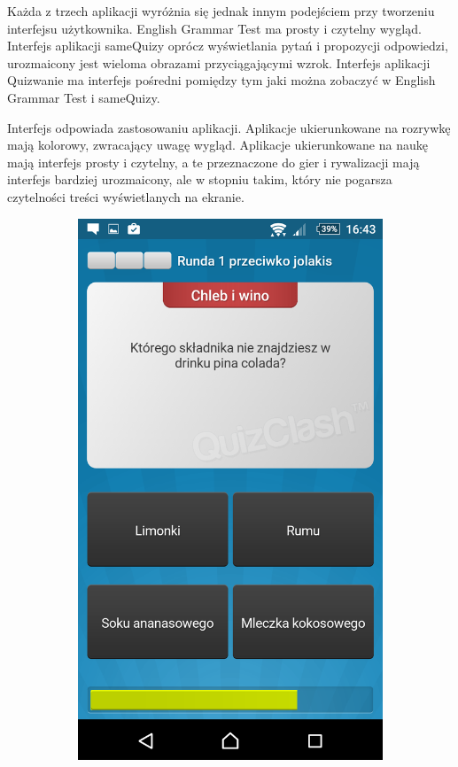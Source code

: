 \documentclass[eng]{mgr}
\begin{document}
		Każda z trzech aplikacji wyróżnia się jednak innym podejściem przy tworzeniu interfejsu użytkownika. English Grammar Test ma prosty i czytelny wygląd. Interfejs aplikacji sameQuizy oprócz wyświetlania pytań i propozycji odpowiedzi, urozmaicony jest wieloma obrazami przyciągającymi wzrok. Interfejs aplikacji Quizwanie ma interfejs pośredni pomiędzy tym jaki można zobaczyć w English Grammar Test i sameQuizy.
		
		Interfejs odpowiada zastosowaniu aplikacji. Aplikacje ukierunkowane na rozrywkę mają kolorowy, zwracający uwagę wygląd. Aplikacje ukierunkowane na naukę mają interfejs prosty i czytelny, a te przeznaczone do gier i rywalizacji mają interfejs bardziej urozmaicony, ale w stopniu takim, który nie pogarsza czytelności treści wyświetlanych na ekranie.
		
		\begin{figure}[ht]
			\centering
			\begin{subfigure}{.32\textwidth}
				\centering
				\includegraphics[width=.9\linewidth]{Quizwanie.png}

\end{subfigure}
\end{figure}
\end{document}
